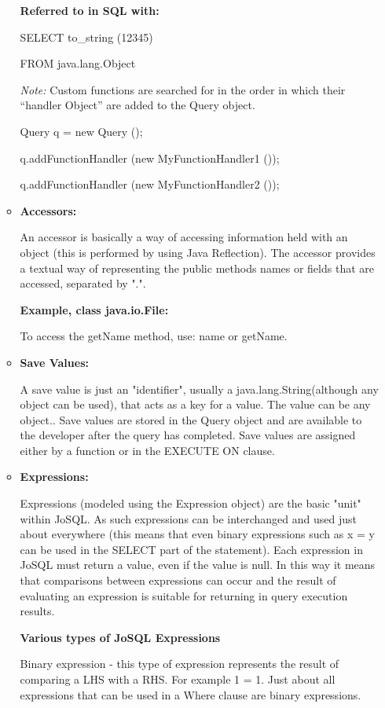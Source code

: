 \begin{enumerate}
\begin{itemize}
\begin{center}
					\textbf{Referred to in SQL with:}\par
					SELECT to\_string (12345)\par
					FROM   java.lang.Object
				\end{center}
				\begin{flushleft}
					\textit{Note:} Custom functions are searched for in the order 
					in which their ``handler Object'' are added to the Query object.
				\end{flushleft}
				\begin{center}

					Query q = new Query ();\par
					q.addFunctionHandler (new MyFunctionHandler1 ());\par
					q.addFunctionHandler (new MyFunctionHandler2 ());
				\end{center}
			\item \textbf{Accessors:}\par
				An accessor is basically a way of accessing information held
				with an object (this is performed by using Java Reflection). The
				accessor provides a textual way of representing the public
				methods names or fields that are accessed, separated by ".".
				\begin{center}
					\textbf{Example, class java.io.File:}\par
					To access the getName method, use:
					name or getName.
				\end{center}

			\item \textbf{Save Values:}\par
				A save value is just an "identifier", usually a 
				java.lang.String(although any object can be used), that acts as
				a key for a value. The value can be any object.. Save values are
				stored in the Query object and are available to the developer
				after the query has completed. Save values are assigned either
				by a function or in the EXECUTE ON clause.

			\item \textbf{Expressions:}\par
				Expressions (modeled using the Expression object) are the basic
				"unit" within JoSQL. As such expressions can be interchanged and
				used just about everywhere (this means that even binary
					expressions such as x = y can be used in the SELECT part of the
					statement). Each expression in JoSQL must return a value, even
				if the value is null. In this way it means that comparisons
				between expressions can occur and the result of evaluating an
				expression is suitable for returning in query execution results. 
				\begin{center}
					\textbf{Various types of JoSQL
						Expressions}\par
					Binary expression - this type of expression represents the
					result of comparing a LHS with a RHS. For example 1 = 1. Just
					about all expressions that can be used in a Where clause are
					binary expressions.


\end{center}
\end{itemize}
\end{enumerate}
